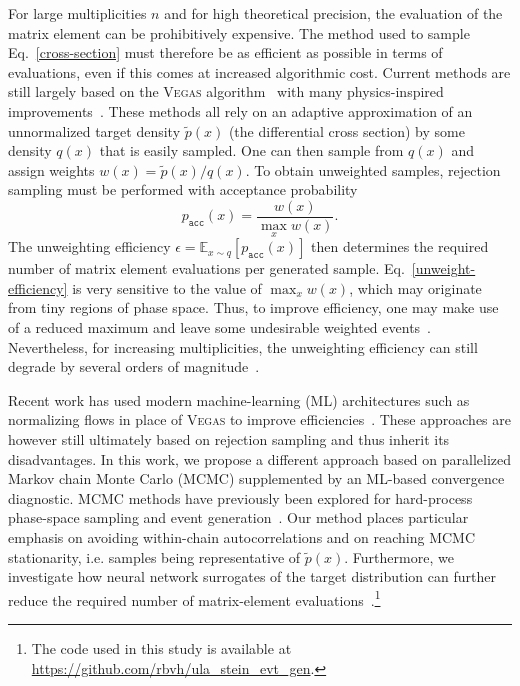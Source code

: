\documentclass[11pt]{article}
\newcommand{\vegas}{\textsc{Vegas}}
\begin{document}
For large multiplicities $n$ and for high theoretical precision, the evaluation of the matrix element can be prohibitively expensive.
The method used to sample Eq.~\eqref{cross-section} must therefore be as efficient as possible in terms of evaluations, even if this comes at increased algorithmic cost. 
Current methods are still largely based on the \vegas{} algorithm~\cite{Lepage:1977sw,Lepage:2020tgj} with many physics-inspired improvements~\cite{Kleiss:1994qy,Ohl:1998jn,Maltoni:2002qb,Krauss:2001iv,Papadopoulos:2000tt,Kilian:2007gr,Jadach:2002kn,Gleisberg:2008fv}.
These methods all rely on an adaptive approximation of an unnormalized target density $\widetilde{p}(x)$ (the differential cross section) by some density $q(x)$ that is easily sampled. 
One can then sample from $q(x)$ and assign weights $w(x) = \widetilde{p}(x)/q(x)$. 
To obtain unweighted samples, rejection sampling must be performed with acceptance probability 
\begin{equation} \label{unweight-efficiency}
  p_{\texttt{acc}}(x) = \frac{w(x)}{\max_x w(x)}.
\end{equation}
The unweighting efficiency $\epsilon = \mathbb{E}_{x \sim q} \left[p_{\texttt{acc}}(x)\right]$ then determines the required number of matrix element evaluations per generated sample.
Eq.~\ref{unweight-efficiency} is very sensitive to the value of $\max_x w(x)$, which may originate from tiny regions of phase space.
Thus, to improve efficiency, one may make use of a reduced maximum and leave some undesirable weighted events~\cite{Sherpa:2024mfk}. 
Nevertheless, for increasing multiplicities, the unweighting efficiency can still degrade by several orders of magnitude~\cite{Hoche:2019flt}.

Recent work has used modern machine-learning (ML) architectures such as normalizing flows in place of \vegas{} to improve efficiencies~\cite{Klimek:2018mza,Bothmann:2020ywa,Gao:2020zvv,Stienen:2020gns,Heimel:2022wyj,Verheyen:2022tov,Heimel:2023ngj,Heimel:2024wph}.
These approaches are however still ultimately based on rejection sampling and thus inherit its disadvantages. 
In this work, we propose a different approach based on parallelized Markov chain Monte Carlo (MCMC) supplemented by an ML-based convergence diagnostic. 
MCMC methods have previously been explored for hard-process phase-space sampling and event generation~\cite{Kharraziha:1999iw,Weinzierl:2001ny,Kroeninger:2014bwa,LaCagnina:2024wcc}.
Our method places particular emphasis on avoiding within-chain autocorrelations and on reaching MCMC stationarity, i.e. samples being representative of $\widetilde{p}(x)$. 
Furthermore, we investigate how neural network surrogates of the target distribution can further reduce the required number of matrix-element evaluations~\cite{Danziger:2021eeg,Janssen:2023ahv,Herrmann:2025nnz}.\footnote{The code used in this study is available at \url{https://github.com/rbvh/ula_stein_evt_gen}.} 
\end{document}
